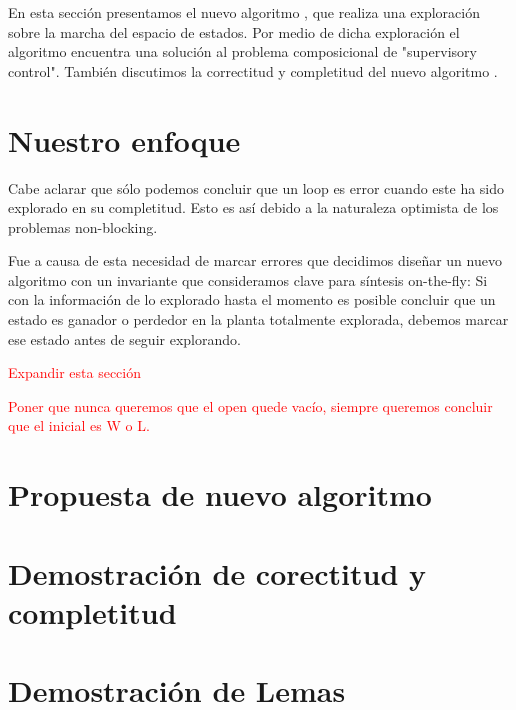 
En esta sección presentamos el nuevo algoritmo \DCS, que realiza una exploración sobre la marcha del espacio de estados. Por medio de dicha exploración el algoritmo encuentra una solución al problema composicional de "supervisory control". También discutimos la correctitud y completitud del nuevo algoritmo \DCS. \\

\section{Nuestro enfoque}

Cabe aclarar que sólo podemos concluir que un loop es error cuando este ha sido explorado en su completitud. Esto es así debido a la naturaleza optimista de los problemas non-blocking.

Fue a causa de esta necesidad de marcar errores que decidimos diseñar un nuevo algoritmo con un invariante que consideramos clave para síntesis on-the-fly: Si con la información de lo explorado hasta el momento es posible concluir que un estado es ganador o perdedor en la planta totalmente explorada, debemos marcar ese estado antes de seguir explorando.

\textcolor{red}{Expandir esta sección}

\textcolor{red}{Poner que nunca queremos que el open quede vacío, siempre queremos concluir que el inicial es W o L.}

\section{Propuesta de nuevo algoritmo}



\FloatBarrier

\section{Demostración de corectitud y completitud}


\section{Demostración de Lemas}

